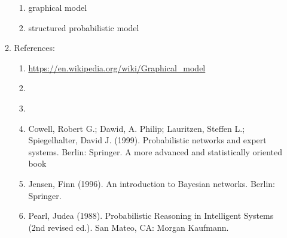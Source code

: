 \begin{enumerate}
\begin{enumerate}
\begin{enumerate}
		\item graphical model
		\item structured probabilistic model
		\end{enumerate}
	\item References: \vspace{-0.2cm}
		\begin{enumerate} \itemsep -2pt
		\item \url{https://en.wikipedia.org/wiki/Graphical_model}
		\item \cite{Barber2012}
		\item \cite{Bishop2006}
		\item Cowell, Robert G.; Dawid, A. Philip; Lauritzen, Steffen L.; Spiegelhalter, David J. (1999). Probabilistic networks and expert systems. Berlin: Springer. A more advanced and statistically oriented book
		\item Jensen, Finn (1996). An introduction to Bayesian networks. Berlin: Springer.
		\item Pearl, Judea (1988). Probabilistic Reasoning in Intelligent Systems (2nd revised ed.). San Mateo, CA: Morgan Kaufmann. 
		\end{enumerate}
	\end{enumerate}
\end{enumerate}





